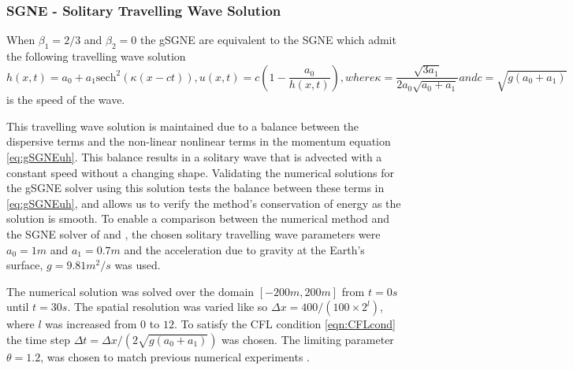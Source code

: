 \documentclass[10pt]{elsarticle}
\providecommand{\DIFaddtex}[1]{{\protect\color{blue} \sf #1}} %
\providecommand{\DIFdeltex}[1]{{\protect\color{red} \scriptsize #1}} %
\providecommand{\DIFaddbegin}{} %
\providecommand{\DIFaddend}{} %
\providecommand{\DIFdelbegin}{} %
\providecommand{\DIFdelend}{} %
\providecommand{\DIFadd}[1]{\texorpdfstring{\DIFaddtex{#1}}{#1}} %
\providecommand{\DIFdel}[1]{\texorpdfstring{\DIFdeltex{#1}}{}} %
\newcommand{\DIFscaledelfig}{0.5}
\newlength{\DIFdelgraphicswidth} %
\newlength{\DIFdelgraphicsheight} %
\newcommand{\DIFaddincludegraphics}[2][]{{\color{blue}\fbox{\DIFOincludegraphics[#1]{#2}}}} %
\newcommand{\DIFdelincludegraphics}[2][]{%
\sbox{\DIFdelgraphicsbox}{\DIFOincludegraphics[#1]{#2}}%
\settoboxwidth{\DIFdelgraphicswidth}{\DIFdelgraphicsbox} %
\settoboxtotalheight{\DIFdelgraphicsheight}{\DIFdelgraphicsbox} %
\scalebox{\DIFscaledelfig}{%
\parbox[b]{\DIFdelgraphicswidth}{\usebox{\DIFdelgraphicsbox}\\[-\baselineskip] \rule{\DIFdelgraphicswidth}{0em}}\llap{\resizebox{\DIFdelgraphicswidth}{\DIFdelgraphicsheight}{%
\setlength{\unitlength}{\DIFdelgraphicswidth}%
\begin{picture}(1,1)%
\thicklines\linethickness{2pt} %
{\color[rgb]{1,0,0}\put(0,0){\framebox(1,1){}}}%
{\color[rgb]{1,0,0}\put(0,0){\line( 1,1){1}}}%
{\color[rgb]{1,0,0}\put(0,1){\line(1,-1){1}}}%
\end{picture}%
}\hspace*{3pt}}} %
} %
\DeclareRobustCommand{\DIFaddbegin}{\DIFOaddbegin \let\includegraphics\DIFaddincludegraphics} %
\DeclareRobustCommand{\DIFaddend}{\DIFOaddend \let\includegraphics\DIFOincludegraphics} %
\DeclareRobustCommand{\DIFdelbegin}{\DIFOdelbegin \let\includegraphics\DIFdelincludegraphics} %
\DeclareRobustCommand{\DIFdelend}{\DIFOaddend \let\includegraphics\DIFOincludegraphics} %
\begin{document}
\subsubsection{SGNE - Solitary Travelling Wave Solution}
When $\beta_1 = 2/3$ and $\beta_2 = 0$ the gSGNE are equivalent to the SGNE which admit the following travelling wave solution \cite{El-etal-2006}
\begin{subequations}
	\begin{equation}
	h(x,t) = a_0 + a_1 \text{sech}^2\left( \kappa (x - ct) \right),
	\end{equation}
	\begin{equation}
	u(x,t) = c \left( 1- \dfrac{a_0}{h(x,t)} \right),
	\end{equation}
	where
	\begin{equation}
	\kappa = \dfrac{\sqrt{3a_1}}{2a_0 \sqrt{a_0 + a_1}}
	\end{equation}
	and
	\begin{equation}
	c = \sqrt{g\left(a_0 + a_1\right)}
	\label{eq:Sol_speed}
	\end{equation}
\end{subequations}
is the speed of the wave.

This travelling wave solution is maintained due to a balance between the dispersive terms and the \DIFdelbegin \DIFdel{non-linear }\DIFdelend \DIFaddbegin \DIFadd{nonlinear }\DIFaddend terms in the momentum equation \eqref{eq:gSGNEuh}. This balance results in a solitary wave that is advected with a constant speed without a changing shape. Validating the numerical solutions for the gSGNE solver using this solution tests the balance between these terms in \eqref{eq:gSGNEuh}, and allows us to verify the method's conservation of energy as the solution is smooth. To enable a comparison between the numerical method and the SGNE solver of \citet{Zoppou-etal-2017} and \citet{Pitt-2019}, the chosen solitary travelling wave parameters were $a_0 = 1m$ and $a_1 = 0.7m$ and the acceleration due to gravity at the Earth's surface, $g = 9.81 m^2/s$ was used.


The numerical solution was solved over the domain $\left[-200m,200m\right]$ from $t=0s$ until $t=30s$. The spatial resolution was varied like so $\Delta x = 400 / (100 \times 2^{l})$, where $l$ was increased from $0$ to $12$. To satisfy the CFL condition \eqref{eqn:CFLcond} the time step $\Delta t = \Delta x  / ( 2 \sqrt{g(a_0 + a_1)})$ was chosen. The limiting parameter $\theta = 1.2$, was chosen to match previous numerical experiments \cite{Zoppou-etal-2017,Pitt-2019}.
\end{document}
